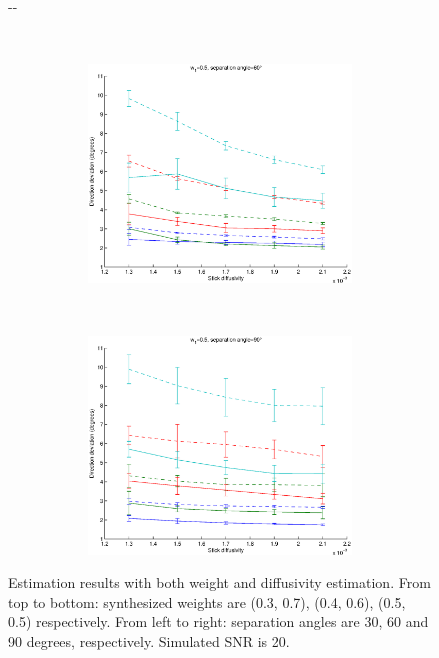 \documentclass{article}
\begin{document}
\begin{figure}[H]
\begin{adjustwidth}{-\oddsidemargin}{-\rightmargin}
\begin{subfigure}{0.8\paperwidth}
\begin{subfigure}{0.3\textwidth}
      \end{subfigure}
      ~
      \begin{subfigure}{0.3\textwidth}
        \centering
        \includegraphics[width=\textwidth]{figures/synth_modbas_weights_diffus__snr=20__w1=5__angle=60.eps}
      \end{subfigure}
      ~
      \begin{subfigure}{0.3\textwidth}
        \centering
        \includegraphics[width=\textwidth]{figures/synth_modbas_weights_diffus__snr=20__w1=5__angle=90.eps}
      \end{subfigure}
  \end{subfigure}
\end{adjustwidth}
  \caption{Estimation results with both weight and diffusivity estimation. From top to bottom: synthesized weights are (0.3, 0.7), (0.4, 0.6), (0.5, 0.5) respectively. From left to right: separation angles are 30, 60 and 90 degrees, respectively. Simulated SNR is 20.}
\end{figure}
\end{document}
